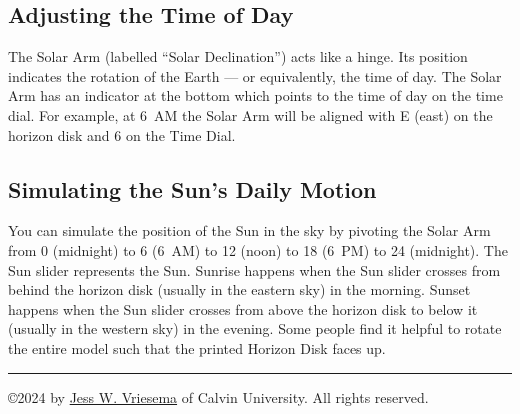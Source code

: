\documentclass[tikz]{article}
\newif\ifPrintInstructions  %
\newif\ifPrintWishlist  %
\begin{document}
\begin{multicols}{2}
	\subsection{Adjusting the Time of Day}
	The Solar Arm (labelled ``Solar Declination'') acts like a hinge. Its position indicates the rotation of the Earth --- or equivalently, the time of day. The Solar Arm has an indicator at the bottom which points to the time of day on the time dial. For example, at 6~AM the Solar Arm will be aligned with E (east) on the horizon disk and 6 on the Time Dial. 
	
	\subsection{Simulating the Sun's Daily Motion}
	You can simulate the position of the Sun in the sky by pivoting the Solar Arm from 0 (midnight) to 6 (6~AM) to 12 (noon) to 18 (6~PM) to 24 (midnight). The Sun slider represents the Sun. Sunrise happens when the Sun slider crosses from behind the horizon disk (usually in the eastern sky) in the morning. Sunset happens when the Sun slider crosses from above the horizon disk to below it (usually in the western sky) in the evening. Some people find it helpful to rotate the entire model such that the printed Horizon Disk faces up.
\vfill
\hrule 
\noindent\copyright 2024 by \href{https://www.lpl.arizona.edu/~vriesema/}{Jess W. Vriesema} of Calvin University. All rights reserved. 
	\end{multicols}
\fi %








\ifPrintWishlist
	\newpage
	
\end{document}
